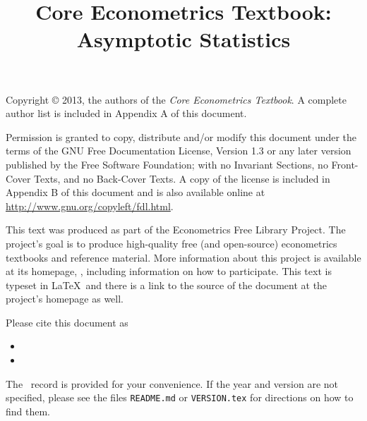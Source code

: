 \documentclass[nohyper]{tex/tufte-handout}
\title{Core Econometrics Textbook: Asymptotic Statistics}
\begin{document}
\maketitle

\bigskip\noindent%
Copyright © 2013, the authors of the \textit{Core Econometrics Textbook}.
A complete author list is included in Appendix A of this document.

Permission is granted to copy, distribute and/or modify this document
under the terms of the GNU Free Documentation License, Version 1.3 or
any later version published by the Free Software Foundation; with no
Invariant Sections, no Front-Cover Texts, and no Back-Cover Texts.  A
copy of the license is included in Appendix B of this document and is
also available online at \url{http://www.gnu.org/copyleft/fdl.html}.

This text was produced as part of the Econometrics Free Library
Project.  The project's goal is to produce high-quality free (and
open-source) econometrics textbooks and reference material.  More
information about this project is available at its homepage,
\homepage, including information on how
to participate.  This text is typeset in \LaTeX\ and there is a link
to the source of the document at the project's homepage as well.

Please cite this document as
\begin{itemize}
\item[] 
\item[] 
\end{itemize}
The \BibTeX\ record is provided for your convenience.
If the year and version are not specified, please see the files
\texttt{README.md} or \texttt{VERSION.tex} for directions on how to
find them.

\tableofcontents










\end{document}

